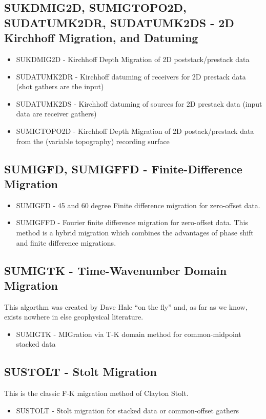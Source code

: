 {{{{{{{\subsection{SUKDMIG2D, SUMIGTOPO2D, SUDATUMK2DR, SUDATUMK2DS - 2D Kirchhoff Migration,
and Datuming}
\begin{itemize}
\item SUKDMIG2D - Kirchhoff Depth Migration of 2D poststack/prestack data 
\item SUDATUMK2DR - Kirchhoff datuming of receivers for 2D prestack data
(shot gathers are the input)
\item SUDATUMK2DS - Kirchhoff datuming of sources for 2D prestack data
(input data are receiver gathers)
\item SUMIGTOPO2D - Kirchhoff Depth Migration of 2D postack/prestack data
from the (variable topography) recording surface
\end{itemize}

\subsection{SUMIGFD, SUMIGFFD - Finite-Difference Migration}
\begin{itemize}
\item SUMIGFD - 45 and 60 degree Finite difference migration for zero-offset data.
\item SUMIGFFD - Fourier finite difference migration for zero-offset data. This method is a hybrid migration which
combines the advantages of phase shift and finite difference migrations.
\end{itemize}

\subsection{SUMIGTK - Time-Wavenumber Domain Migration}

This algorthm was created by Dave Hale ``on the fly'' and, as
far as we know, exists nowhere in else geophysical literature.

\begin{itemize}
\item SUMIGTK - MIGration via T-K domain method for common-midpoint stacked data
\end{itemize}

\subsection{SUSTOLT - Stolt Migration}
This is the classic F-K migration method of Clayton Stolt.
\begin{itemize}
\item SUSTOLT - Stolt migration for stacked data or common-offset gathers 
\end{itemize}

}}}}}}}
